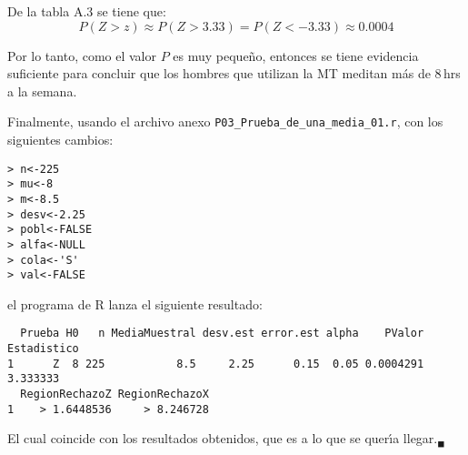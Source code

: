 \begin{solucion}
 \begin{valorp}
  De la tabla A.3 se tiene que:
  \begin{equation*}
   P(Z > z) \approx P(Z > 3.33) = P(Z < -3.33) \approx 0.0004
  \end{equation*}
 \end{valorp}

 \begin{conclusion}
  Por lo tanto, como el valor $P$ es muy peque\~no, entonces se tiene evidencia suficiente para concluir que los hombres que utilizan la MT meditan m\'as de $8\,$hrs a la semana.
 \end{conclusion}
 Finalmente, usando el archivo anexo \texttt{P03\_Prueba\_de\_una\_media\_01.r}, con los siguientes cambios:
 \begin{verbatim}
> n<-225
> mu<-8
> m<-8.5
> desv<-2.25
> pobl<-FALSE
> alfa<-NULL
> cola<-'S'
> val<-FALSE
 \end{verbatim}
 \vspace{-0.5cm}
 el programa de R lanza el siguiente resultado:
 \begin{verbatim}
  Prueba H0   n MediaMuestral desv.est error.est alpha    PValor Estadistico
1      Z  8 225           8.5     2.25      0.15  0.05 0.0004291    3.333333
  RegionRechazoZ RegionRechazoX
1    > 1.6448536     > 8.246728
 \end{verbatim}
 \vspace{-0.5cm}
 El cual coincide con los resultados obtenidos, que es a lo que se quer\'{\i}a llegar.${}_{\blacksquare}$
\end{solucion}
